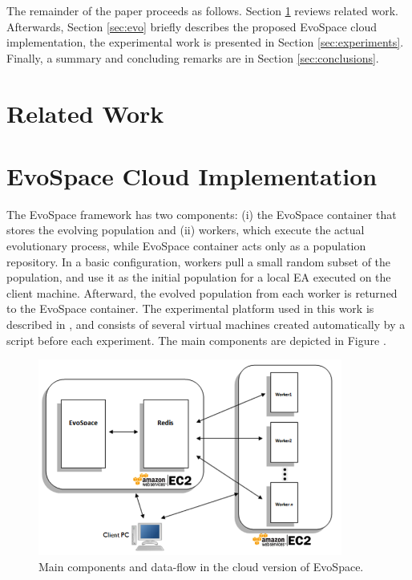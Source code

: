 \documentclass{llncs}
\begin{document}
The remainder of the paper proceeds as follows.  Section \ref{sec:work} 
reviews related work. Afterwards, Section \ref{sec:evo} briefly describes the
proposed EvoSpace cloud implementation, the experimental work is presented in 
Section \ref{sec:experiments}. Finally, a summary and concluding remarks are in
Section \ref{sec:conclusions}.

\section{Related Work}
\label{sec:work}

\section{EvoSpace Cloud Implementation}
The EvoSpace \cite{GValdez2015} framework has two components: (i) the EvoSpace 
container that stores the evolving population and (ii) workers, which execute 
the actual evolutionary process, while EvoSpace container acts only as a population repository.
In a basic configuration, workers pull a small random subset of the 
population, and use it as the initial population for a local EA executed 
on the client machine. Afterward, the evolved population from each worker 
is returned to the EvoSpace container. The experimental platform used in this work is
described in \cite{valenzuela2015implementing}, and consists of several virtual machines
created automatically by a script before each experiment. The main components are depicted
in Figure \cite{fig:evospace}. 




\label{sec:evo}
\begin{figure}[t]
    \centering
        \includegraphics[width=10cm]{img/evospace-aws.png}
    \caption{Main components and data-flow in the cloud version of EvoSpace. }
    \label{fig:evospace}
\end{figure}
\end{document}

